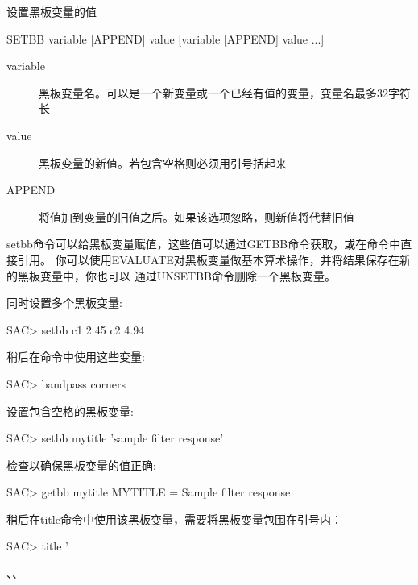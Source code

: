 \label{cmd:setbb}

设置黑板变量的值

\begin{SACSTX}
SETBB variable  [APPEND] value [variable [APPEND] value ...]
\end{SACSTX}

\begin{description}
\item [variable] 黑板变量名。可以是一个新变量或一个已经有值的变量，变量名最多32字符长
\item [value] 黑板变量的新值。若包含空格则必须用引号括起来 
\item [APPEND] 将值加到变量的旧值之后。如果该选项忽略，则新值将代替旧值 
\end{description}

setbb命令可以给黑板变量赋值，这些值可以通过GETBB命令获取，或在命令中直接引用。
你可以使用EVALUATE对黑板变量做基本算术操作，并将结果保存在新的黑板变量中，你也可以
通过UNSETBB命令删除一个黑板变量。

同时设置多个黑板变量:
\begin{SACCode}
SAC> setbb c1 2.45 c2 4.94
\end{SACCode}

稍后在命令中使用这些变量:
\begin{SACCode}
SAC> bandpass corners %
\end{SACCode}

设置包含空格的黑板变量:
\begin{SACCode}
SAC> setbb mytitle 'sample filter response'
\end{SACCode}

检查以确保黑板变量的值正确:
\begin{SACCode}
SAC> getbb mytitle
 MYTITLE = Sample filter response
\end{SACCode}

稍后在title命令中使用该黑板变量，需要将黑板变量包围在引号内：
\begin{SACCode}
SAC> title '%
\end{SACCode}

、、
